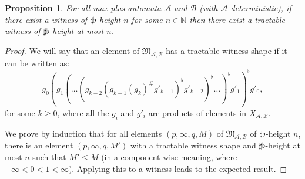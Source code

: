 \documentclass[10pt,a4paper]{amsart}
\newtheorem{prop}[prop]{Proposition}
\theoremstyle{definition}
\numberwithin{equation}{section}
\theoremstyle{remark}
\newcommand{\N}{\mathbb{N}}
\newcommand{\ideal}{\mathfrak{M}}
\newcommand{\autA}{\mathcal{A}}
\newcommand{\autB}{\mathcal{B}}
\theoremstyle{remark}
\begin{document}
\begin{prop}
\label{prop:witnesssfh}
For all max-plus automata $\autA$ and $\autB$ (with $\autA$ deterministic), if there exist a witness of $\sharp\flat$-height $n$ for some $n \in \N$ then there exist a tractable witness of $\sharp\flat$-height at most $n$.
\end{prop}

\begin{proof}
We will say that an element of $\ideal_{\autA,\autB}$ has a tractable witness shape if it can be written as:
\[g_0 (g_1 (\dots (g_{k-2} ( g_{k-1} (g_{k})^\#g'_{k-1})^\flat g'_{k-2})^\flat \dots)^\flat g'_{1})^\flat g'_{0},\] 
for some $k \geq 0$, where all the $g_i$ and $g'_i$ are products of elements in $X_{\autA,\autB}$.

We prove by induction that for all elements $(p,\infty,q,M)$ of $\ideal_{\autA,\autB}$ of $\sharp\flat$-height $n$, there is an element $(p,\infty,q,M')$ with a tractable witness shape and $\sharp\flat$-height at most $n$ such that $M' \leq M$ (in a component-wise meaning, where $-\infty<0<1<\infty$). Applying this to a witness leads to the expected result.


\end{proof}
\end{document}
